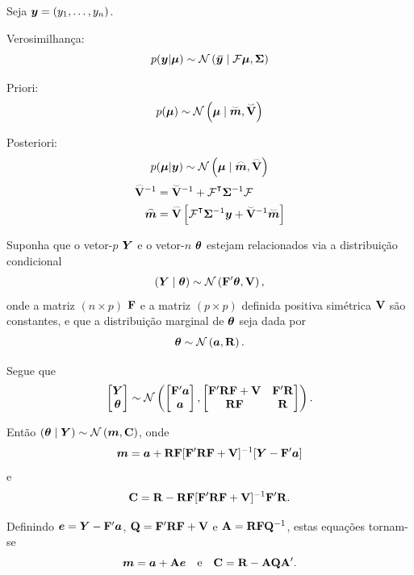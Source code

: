 \begin{theorem}
	\leavevmode
	Seja $\bm{y} = (y_1, \ldots, y_n)$.
	\begin{outline}[enumerate]
		\1 Verosimilhança:
		\[ p(\v{y}|\v{\mu}) \sim \normdist{\bar{\v{y}} \mid \m{\Fcal}\v{\mu}, \m{\Sigma}} \] 
		
		\1 Priori:
		\[ p(\v{\mu}) \sim \normdist{\v{\mu} \mid \prior{\v{m}}, \prior{\m{V}}} \]
		
		\1 Posteriori:
		\[
		p(\v{\mu} | \v{y}) \sim \normdist{\v{\mu} \mid \post{\v{m}}, \post{\m{V}}}
		\]
		\begin{align}
			\post{\m{V}}^{-1} &= \prior{\m{V}}^{-1} + \m{\Fcal}\T \m{\Sigma}^{-1} \m{\Fcal} \\
			\post{\v{m}} &= \post{\m{V}} \left[ \m{\Fcal}\T  \m{\Sigma}^{-1}{\v{y}} + \prior{\m{V}}^{-1} \prior{\v{m}} \right]  
		\end{align}
	\end{outline}
\end{theorem}

\begin{theorem}
	Suponha que o vetor-$p$ $\bm{Y}$ e o vetor-$n$ $\bm{\theta}$ estejam relacionados via a distribuição condicional
	\[
	(\v{Y} \mid \v{\theta}) \sim \normdist{\m{F}'\v{\theta}, \m{V}},
	\]
	onde a matriz $(n \times p)$ $\mathbf{F}$ e a matriz $(p \times p)$ definida positiva simétrica $\mathbf{V}$ são constantes, e que a distribuição marginal de $\bm{\theta}$ seja dada por
	\[
	\v{\theta} \sim \normdist{\v{a}, \m{R}}.
	\]
	
	Segue que
	\[
	\begin{bmatrix}
		\v{Y} \\ \v{\theta}
	\end{bmatrix} \sim \normdist{\begin{bmatrix}
			\m{F}'\v{a} \\ \v{a}
		\end{bmatrix}, \begin{bmatrix}
			\m{F}'\m{R}\m{F} + \m{V} & \m{F}'\m{R} \\
			\m{R}\m{F} & \m{R}
	\end{bmatrix}}.
	\]
	
	Então $(\v{\theta} \mid \v{Y}) \sim \normdist{\v{m}, \m{C}}$, onde
	\[
	\bm{m} = \bm{a} + \mathbf{R}\mathbf{F}[\mathbf{F}'\mathbf{R}\mathbf{F} + \mathbf{V}]^{-1}[\bm{Y} - \mathbf{F}'\bm{a}]
	\]
	e
	\[
	\mathbf{C} = \mathbf{R} - \mathbf{R}\mathbf{F}[\mathbf{F}'\mathbf{R}\mathbf{F} + \mathbf{V}]^{-1}\mathbf{F}'\mathbf{R}.
	\]
	
	Definindo $\bm{e} = \bm{Y} - \mathbf{F}'\bm{a}$, $\mathbf{Q} = \mathbf{F}'\mathbf{R}\mathbf{F} + \mathbf{V}$ e $\mathbf{A} = \mathbf{R}\mathbf{F}\mathbf{Q}^{-1}$, estas equações tornam-se
	\[
	\bm{m} = \bm{a} + \mathbf{A}\bm{e} \quad \text{e} \quad \mathbf{C} = \mathbf{R} - \mathbf{A}\mathbf{Q}\mathbf{A}'.
	\]
\end{theorem}

